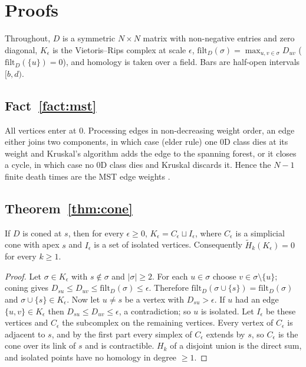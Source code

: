 
\section{Proofs}
\label{app:proofs}

Throughout, $D$ is a symmetric $N\times N$ matrix with non-negative entries and zero diagonal, $K_\epsilon$ is the Vietoris--Rips complex at scale $\epsilon$, $\mathrm{filt}_D(\sigma)=\max_{u,v\in\sigma}D_{uv}$ ($\mathrm{filt}_D(\{u\})=0$), and homology is taken over a field. Bars are half-open intervals $[b,d)$.

\subsection{Fact~\ref{fact:mst}}
All vertices enter at $0$. Processing edges in non-decreasing weight order, an edge either joins two components, in which case (elder rule) one $0$D class dies at its weight and Kruskal's algorithm adds the edge to the spanning forest, or it closes a cycle, in which case no $0$D class dies and Kruskal discards it. Hence the $N-1$ finite death times are the MST edge weights \citep{gower1969,edelsbrunner2010}.

\subsection{Theorem~\ref{thm:cone}}

\begin{lemma}
\label{lem:coned}
If $D$ is coned at $s$, then for every $\epsilon\ge0$, $K_\epsilon=C_\epsilon\sqcup I_\epsilon$, where $C_\epsilon$ is a simplicial cone with apex $s$ and $I_\epsilon$ is a set of isolated vertices. Consequently $\tilde H_k(K_\epsilon)=0$ for every $k\ge1$.
\end{lemma}
\begin{proof}
Let $\sigma\in K_\epsilon$ with $s\notin\sigma$ and $|\sigma|\ge2$. For each $u\in\sigma$ choose $v\in\sigma\setminus\{u\}$; coning gives $D_{su}\le D_{uv}\le\mathrm{filt}_D(\sigma)\le\epsilon$. Therefore $\mathrm{filt}_D(\sigma\cup\{s\})=\mathrm{filt}_D(\sigma)$ and $\sigma\cup\{s\}\in K_\epsilon$. Now let $u\ne s$ be a vertex with $D_{su}>\epsilon$. If $u$ had an edge $\{u,v\}\in K_\epsilon$ then $D_{su}\le D_{uv}\le\epsilon$, a contradiction; so $u$ is isolated. Let $I_\epsilon$ be these vertices and $C_\epsilon$ the subcomplex on the remaining vertices. Every vertex of $C_\epsilon$ is adjacent to $s$, and by the first part every simplex of $C_\epsilon$ extends by $s$, so $C_\epsilon$ is the cone over its link of $s$ and is contractible. $H_k$ of a disjoint union is the direct sum, and isolated points have no homology in degree $\ge1$.
\end{proof}

